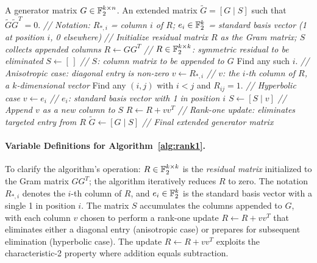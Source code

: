 \begin{algorithm}[tb]
\caption{\textsc{Rank-OneElimination}}
\label{alg:rank1}
\begin{algorithmic}
\REQUIRE A generator matrix $G \in \mathbb{F}_2^{k \times n}$.
\ENSURE An extended matrix $\widetilde{G}=[G\mid S]$ such that $\widetilde{G}\widetilde{G}^{T}=0$.
\STATE \textit{// Notation: $R_{*,i}$ = column $i$ of $R$; $e_i \in \mathbb{F}_2^k$ = standard basis vector (1 at position $i$, 0 elsewhere)}
\STATE \textit{// Initialize residual matrix $R$ as the Gram matrix; $S$ collects appended columns}
\STATE $R \gets GG^T$ \hfill \textit{// $R \in \mathbb{F}_2^{k \times k}$: symmetric residual to be eliminated}
\STATE $S \gets [\,]$ \hfill \textit{// $S$: column matrix to be appended to $G$}
            \STATE Find any such $i$. \hfill \textit{// Anisotropic case: diagonal entry is non-zero}
            \STATE $v \gets R_{*,i}$ \hfill \textit{// $v$: the $i$-th column of $R$, a $k$-dimensional vector}
        \ELSE
            \STATE Find any $(i,j)$ with $i<j$ and $R_{ij}=1$. \hfill \textit{// Hyperbolic case}
            \STATE $v \gets e_i$ \hfill \textit{// $e_i$: standard basis vector with 1 in position $i$}
        \ENDIF
        \STATE $S \gets [S \mid v]$ \hfill \textit{// Append $v$ as a new column to $S$}
        \STATE $R \gets R + vv^T$ \hfill \textit{// Rank-one update: eliminates targeted entry from $R$}
    \ENDWHILE
\STATE $\widetilde{G} \gets [G \mid S]$ \hfill \textit{// Final extended generator matrix}
\end{algorithmic}
\end{algorithm}

\paragraph{Variable Definitions for Algorithm~\ref{alg:rank1}.} To clarify the algorithm's operation: $R \in \mathbb{F}_2^{k \times k}$ is the \textit{residual matrix} initialized to the Gram matrix $GG^T$; the algorithm iteratively reduces $R$ to zero. The notation $R_{*,i}$ denotes the $i$-th column of $R$, and $e_i \in \mathbb{F}_2^k$ is the standard basis vector with a single 1 in position $i$. The matrix $S$ accumulates the columns appended to $G$, with each column $v$ chosen to perform a rank-one update $R \gets R + vv^T$ that eliminates either a diagonal entry (anisotropic case) or prepares for subsequent elimination (hyperbolic case). The update $R \gets R + vv^T$ exploits the characteristic-2 property where addition equals subtraction.

